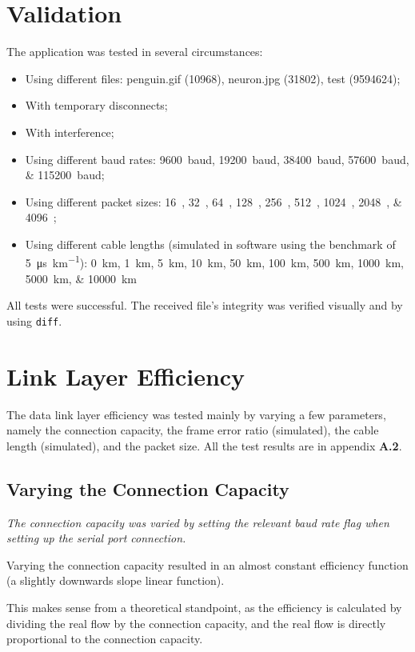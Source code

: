 \documentclass[11pt,a4paper,twocolumn]{article}
\begin{document}
\section{Validation}

The application was tested in several circumstances:

\begin{itemize}
    \item Using different files: penguin.gif (\qty{10968}{\byte}), neuron.jpg (\qty{31802}{\byte}), test (\qty{9594624}{\byte});
    \item With temporary disconnects;
    \item With interference;
    \item Using different baud rates: \qtylist{9600;19200;38400;57600;115200}{baud};
    \item Using different packet sizes: \qtylist{16;32;64;128;256;512;1024;2048;4096}{\byte};
    \item Using different cable lengths (simulated in software using the benchmark of \qty[per-mode=symbol]{5}{\micro\second\per\kilo\metre}): \qtylist{0;1;5;10;50;100;500;1000;5000;10000}{\kilo\metre}
\end{itemize}

All tests were successful.
The received file's integrity was verified visually and by using \lstinline{diff}.

\section{Link Layer Efficiency}

The data link layer efficiency was tested mainly by varying a few parameters, namely the connection capacity, the frame error ratio (simulated), the cable length (simulated), and the packet size.
All the test results are in appendix \textbf{A.2}.

\subsection{Varying the Connection Capacity}

\textit{The connection capacity was varied by setting the relevant baud rate flag when setting up the serial port connection.}

Varying the connection capacity resulted in an almost constant efficiency function (a slightly downwards slope linear function).

This makes sense from a theoretical standpoint, as the efficiency is calculated by dividing the real flow by the connection capacity, and the real flow is directly proportional to the connection capacity.
\end{document}
